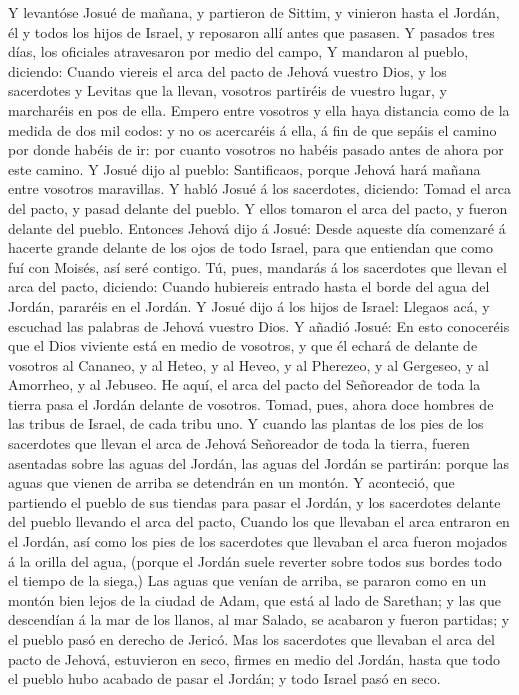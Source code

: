  Y levantóse Josué de mañana, y partieron de Sittim, y
vinieron hasta el Jordán, él y todos los hijos de Israel, y reposaron
allí antes que pasasen.  Y pasados tres días, los
oficiales atravesaron por medio del campo,  Y mandaron al
pueblo, diciendo: Cuando viereis el arca del pacto de Jehová vuestro
Dios, y los sacerdotes y Levitas que la llevan, vosotros partiréis de
vuestro lugar, y marcharéis en pos de ella.  Empero entre
vosotros y ella haya distancia como de la medida de dos mil codos: y no
os acercaréis á ella, á fin de que sepáis el camino por donde habéis de
ir: por cuanto vosotros no habéis pasado antes de ahora por este camino.
 Y Josué dijo al pueblo: Santificaos, porque Jehová hará
mañana entre vosotros maravillas.  Y habló Josué á los
sacerdotes, diciendo: Tomad el arca del pacto, y pasad delante del
pueblo. Y ellos tomaron el arca del pacto, y fueron delante del pueblo.
 Entonces Jehová dijo á Josué: Desde aqueste día comenzaré
á hacerte grande delante de los ojos de todo Israel, para que entiendan
que como fuí con Moisés, así seré contigo.  Tú, pues,
mandarás á los sacerdotes que llevan el arca del pacto, diciendo: Cuando
hubiereis entrado hasta el borde del agua del Jordán, pararéis en el
Jordán.  Y Josué dijo á los hijos de Israel: Llegaos acá,
y escuchad las palabras de Jehová vuestro Dios.  Y añadió
Josué: En esto conoceréis que el Dios viviente está en medio de
vosotros, y que él echará de delante de vosotros al Cananeo, y al Heteo,
y al Heveo, y al Pherezeo, y al Gergeseo, y al Amorrheo, y al Jebuseo.
 He aquí, el arca del pacto del Señoreador de toda la
tierra pasa el Jordán delante de vosotros.  Tomad, pues,
ahora doce hombres de las tribus de Israel, de cada tribu uno.
 Y cuando las plantas de los pies de los sacerdotes que
llevan el arca de Jehová Señoreador de toda la tierra, fueren asentadas
sobre las aguas del Jordán, las aguas del Jordán se partirán: porque las
aguas que vienen de arriba se detendrán en un montón.  Y
aconteció, que partiendo el pueblo de sus tiendas para pasar el Jordán,
y los sacerdotes delante del pueblo llevando el arca del pacto,
 Cuando los que llevaban el arca entraron en el Jordán,
así como los pies de los sacerdotes que llevaban el arca fueron mojados
á la orilla del agua, (porque el Jordán suele reverter sobre todos sus
bordes todo el tiempo de la siega,)  Las aguas que venían
de arriba, se pararon como en un montón bien lejos de la ciudad de Adam,
que está al lado de Sarethan; y las que descendían á la mar de los
llanos, al mar Salado, se acabaron y fueron partidas; y el pueblo pasó
en derecho de Jericó.  Mas los sacerdotes que llevaban el
arca del pacto de Jehová, estuvieron en seco, firmes en medio del
Jordán, hasta que todo el pueblo hubo acabado de pasar el Jordán; y todo
Israel pasó en seco.

